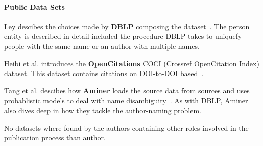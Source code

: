 \documentclass{ou-report}
\begin{document}



\paragraph{Public Data Sets}


Ley descibes the choices made by \textbf{DBLP} composing the
dataset~\cite{DBLP:journals/pvldb/Ley09}. The person entity is described in 
detail included the procedure DBLP takes to uniquefy people with the same name 
or an author with multiple names.

Heibi et al. introduces the \textbf{OpenCitations} COCI (Crossref OpenCitation 
Index) dataset. This dataset contains citations on DOI-to-DOI
based~\cite{DBLP:journals/scientometrics/HeibiPS19}.

Tang et al. descibes how \textbf{Aminer} loads the source data from sources and 
uses probablistic models to deal with name disambiguity~\cite{Tang:08KDD}. As 
with DBLP, Aminer also dives deep in how they tackle the author-naming problem.

No datasets where found by the authors containing other roles involved in the
publication process than author.




\end{document}
